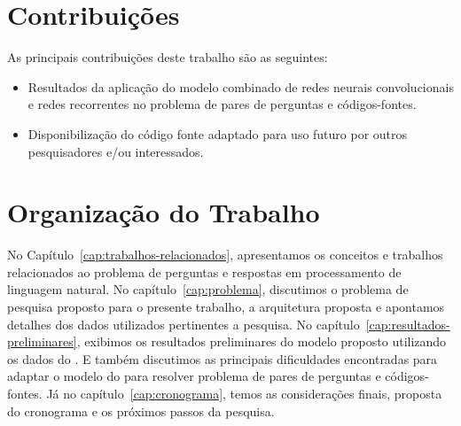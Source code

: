 \section{Contribuições}
\label{sec:contribucoes}

As principais contribuições deste trabalho são as seguintes:

\begin{itemize}
  \item Resultados da aplicação do modelo combinado de redes neurais convolucionais e redes recorrentes no problema de pares de perguntas e códigos-fontes.
  \item Disponibilização do código fonte adaptado para uso futuro por outros pesquisadores e/ou interessados.
\end{itemize}

\section{Organização do Trabalho}
\label{sec:organizacao_trabalho}

No Capítulo~\ref{cap:trabalhos-relacionados}, apresentamos os conceitos e trabalhos relacionados ao problema de perguntas e respostas em processamento de linguagem natural. No capítulo~\ref{cap:problema}, discutimos o problema de pesquisa proposto para o presente trabalho, a arquitetura proposta e apontamos detalhes dos dados utilizados pertinentes a pesquisa. 
No capítulo~\ref{cap:resultados-preliminares}, exibimos os resultados preliminares do modelo proposto utilizando os dados do \cite{yao-2018}. E também discutimos as principais dificuldades encontradas para adaptar o modelo do \cite{feng-2015} para resolver problema de pares de perguntas e códigos-fontes. Já no capítulo~\ref{cap:cronograma}, temos as considerações finais, proposta do cronograma e os próximos passos da pesquisa.
